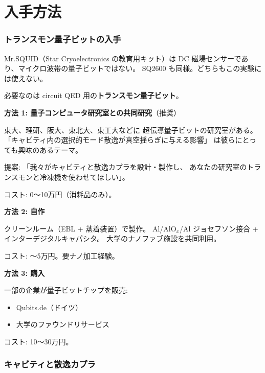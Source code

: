 \documentclass[12pt,a4paper]{article}
\begin{document}
\part{入手方法}

\section{トランスモン量子ビットの入手}

\begin{honestbox}
Mr.SQUID（Star Cryoelectronics の教育用キット）は
DC 磁場センサーであり、マイクロ波帯の量子ビットではない。
SQ2600 も同様。どちらもこの実験には使えない。

必要なのは circuit QED 用の\textbf{トランスモン量子ビット}。
\end{honestbox}

\begin{expbox}
\textbf{方法 1: 量子コンピュータ研究室との共同研究}（推奨）

東大、理研、阪大、東北大、東工大などに
超伝導量子ビットの研究室がある。
「キャビティ内の選択的モード散逸が真空揺らぎに与える影響」
は彼らにとっても興味のあるテーマ。

提案: 「我々がキャビティと散逸カプラを設計・製作し、
あなたの研究室のトランスモンと冷凍機を使わせてほしい」。

コスト: 0〜10万円（消耗品のみ）。

\textbf{方法 2: 自作}

クリーンルーム（EBL + 蒸着装置）で製作。
Al/AlO$_x$/Al ジョセフソン接合 + インターデジタルキャパシタ。
大学のナノファブ施設を共同利用。

コスト: 〜5万円。要ナノ加工経験。

\textbf{方法 3: 購入}

一部の企業が量子ビットチップを販売:
\begin{itemize}
\item Qubits.de（ドイツ）
\item 大学のファウンドリサービス
\end{itemize}

コスト: 10〜30万円。
\end{expbox}

\section{キャビティと散逸カプラ}
\end{document}
